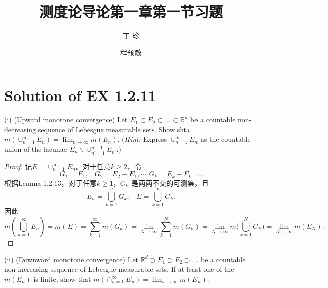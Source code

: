 \documentclass[reqno,a4paper,14pt]{amsart}
\title{\textbf{测度论导论第一章第一节习题}}
\author{丁\;\;\; 珍}
\author{程预敏}
\begin{document}
\maketitle
\section{Solution of EX 1.2.11}
(i) (Upward monotone convergence) Let $E_1\subset E_2\subset \dots \subset \mathbb{R}^n$ be a countable non-decreasing sequence of Lebesgue measurable sets. Show shta $m(\cup_{n=1}^\infty E_n)=\lim_{n\to\infty} m(E_n)$. (\textit{Hint:} Express $\cup_{n=1}^\infty E_n$ as the countable union of the lacunae $E_n\backslash \cup_{n^\prime=1}^{n-1} E_{n^\prime}$.)
\begin{proof}
    记$E=\cup_{n=1}^\infty E_n$。对于任意$k\geq 2$，令
    \begin{equation*}
        G_1=E_1,\;\;\; G_2=E_2-E_1, \cdots, G_k=E_k-E_{k-1}.
    \end{equation*}
    根据Lemma 1.2.13，对于任意$k\geq 1$，$G_k$ 是两两不交的可测集，且
    \begin{equation*}
        E_n=\bigcup_{k=1}^n G_k,\;\;\; E=\bigcup_{k=1}^\infty G_k.
    \end{equation*}
    因此
    \begin{equation*}
        m(\bigcup_{n=1}^\infty E_n)=m(E)=\sum_{k=1}^\infty m(G_k)=\lim_{N\to\infty} \sum_{k=1}^N m(G_k)=\lim_{N\to\infty}m\biggl(\bigcup_{k=1}^N G_k\biggr)=\lim_{N\to\infty}m(E_N).
    \end{equation*}
\end{proof}
(ii) (Downward monotone convergence) Let $\mathbb{R}^d \supset E_1 \supset E_2\supset \dots$ be a countable non-increasing sequence of Lebesgue measurable sets. If at least one of the $m(E_n)$ is finite, show that $m(\cap_{n=1}^\infty E_n)=\lim_{n\to \infty} m(E_n)$.
\end{document}
